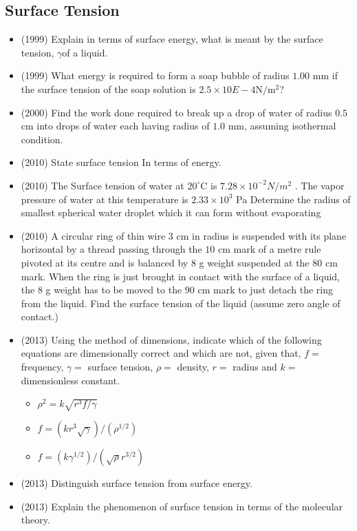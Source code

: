 \documentclass{article}
\begin{document}
\subsection{Surface Tension}
\begin{itemize}
\item (1999)  Explain in terms of surface energy, what is meant by the surface tension, ​ $ \gamma $ ​ of a liquid. 
\item (1999)  What energy is required to form a soap bubble of radius $ 1.00$ mm if the surface tension of the soap solution is $ 2.5 \times 10$ ​$ E-4$ ​ N$/$m$ ^{2}$ ​ ?
\item (2000)  Find the work done required to break up a drop of water of radius $ 0.5$ cm into drops of water each having radius of $ 1.0$ mm, assuming isothermal condition.
\item (2010)  State surface tension In terms of energy. 
\item (2010)  The Surface tension of water at $ 20^{\circ}$C is $ 7.28 \times 10^{-2}N/m^{2}$ . The vapor pressure of water at this temperature is $ 2.33 \times 10^{3}$ Pa Determine the radius of smallest spherical water droplet which it can form without evaporating
\item (2010)  A circular ring of thin wire $ 3$ cm in radius is suspended with its plane horizontal by a thread passing through the $ 10$ cm mark of a metre rule pivoted at its centre and is balanced by $ 8$ g weight suspended at the $ 80$ cm mark. When the ring is just brought in contact with the surface of a liquid, the $ 8$ g weight has to be moved to the $ 90$ cm mark to just detach the ring from the liquid. Find the surface tension of the liquid (assume zero angle of contact.)
\item (2013)  Using the method of dimensions, indicate which of the following equations are dimensionally correct and which are not, given that, $ f=$ frequency, $ \gamma =$ surface tension, $ \rho =$ density, $ r=$ radius and $ k=$ dimensionless constant.\begin{itemize}
\item  $ \rho^{2}=k\sqrt{r^{3}f/\gamma }$
\item  $ f=(kr^{3}\sqrt{\gamma })/(\rho^{1/2})$
\item  $ f=(k\gamma^{1/2})/(\sqrt{\rho}r^{3/2})$
\end{itemize}
\item (2013)  Distinguish surface tension from surface energy.
\item (2013)  Explain the phenomenon of surface tension in terms of the molecular theory.

\end{itemize}
\end{document}
